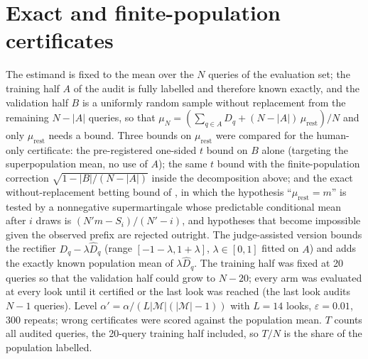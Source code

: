 \documentclass{article}
\newcommand{\eps}{\varepsilon}
\begin{document}
\section{Exact and finite-population certificates}\label{app:exact}
The estimand is fixed to the mean over the $N$ queries of the evaluation set; the training half $A$ of the audit is fully labelled and therefore known exactly, and the validation half $B$ is a uniformly random sample without replacement from the remaining $N-|A|$ queries, so that $\mu_N=(\sum_{q\in A}D_q+(N-|A|)\,\mu_{\text{rest}})/N$ and only $\mu_{\text{rest}}$ needs a bound. Three bounds on $\mu_{\text{rest}}$ were compared for the human-only certificate: the pre-registered one-sided $t$ bound on $B$ alone (targeting the superpopulation mean, no use of $A$); the same $t$ bound with the finite-population correction $\sqrt{1-|B|/(N-|A|)}$ inside the decomposition above; and the exact without-replacement betting bound of \citet{waudby2020wor}, in which the hypothesis ``$\mu_{\text{rest}}=m$'' is tested by a nonnegative supermartingale whose predictable conditional mean after $i$ draws is $(N'm-S_i)/(N'-i)$, and hypotheses that become impossible given the observed prefix are rejected outright. The judge-assisted version bounds the rectifier $D_q-\lambda\hat D_q$ (range $[-1-\lambda,1+\lambda]$, $\lambda\in[0,1]$ fitted on $A$) and adds the exactly known population mean of $\lambda\hat D_q$. The training half was fixed at 20 queries so that the validation half could grow to $N-20$; every arm was evaluated at every look until it certified or the last look was reached (the last look audits $N-1$ queries). Level $\alpha'=\alpha/(L|\mathcal M|(|\mathcal M|-1))$ with $L=14$ looks, $\eps=0.01$, 300 repeats; wrong certificates were scored against the population mean. $T$ counts all audited queries, the 20-query training half included, so $T/N$ is the share of the population labelled.
\end{document}
